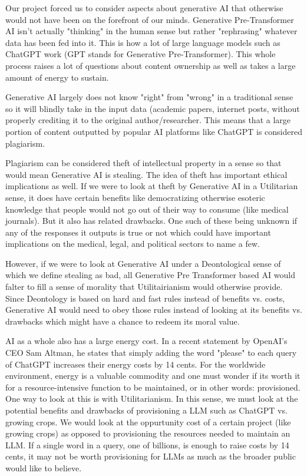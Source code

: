 \documentclass[letterpaper,11pt,leqno]{article}
\begin{document}
Our project forced us to consider aspects about generative AI that otherwise would not have been on the forefront of our minds. Generative Pre-Transformer AI isn't actually "thinking" in the human sense but rather "rephrasing" whatever data has been fed into it. This is how a lot of large language models such as ChatGPT work (GPT stands for Generative Pre-Transformer). This whole process raises a lot of questions about content ownership as well as takes a large amount of energy to sustain.

Generative AI largely does not know "right" from "wrong" in a traditional sense so it will blindly take in the input data (academic papers, internet posts, without properly crediting it to the original author/researcher. This means that a large portion of content outputted by popular AI platforms like ChatGPT is considered plagiarism. 

Plagiarism can be considered theft of intellectual property in a sense so that would mean Generative AI is stealing. The idea of theft has important ethical implications as well. If we were to look at theft by Generative AI in a Utilitarian sense, it does have certain benefits like democratizing otherwise esoteric knowledge that people would not go out of their way to consume (like medical journals). But it also has related drawbacks. One such of these being unknown if any of the responses it outputs is true or not which could have important implications on the medical, legal, and political sectors to name a few. 

However, if we were to look at Generative AI under a Deontological sense of which we define stealing as bad, all Generative Pre Transformer based AI would falter to fill a sense of morality that Utilitairianism would otherwise provide. Since Deontology is based on hard and fast rules instead of benefits vs. costs, Generative AI would need to obey those rules instead of looking at its benefits vs. drawbacks which might have a chance to redeem its moral value. 

AI as a whole also has a large energy cost. In a recent statement by OpenAI's CEO Sam Altman, he states that simply adding the word "please" to each query of ChatGPT increases their energy costs by 14 cents. For the worldwide environment, energy is a valuable commodity and one must wonder if its worth it for a resource-intensive function to be maintained, or in other words: provisioned. One way to look at this is with Utilitarianism. In this sense, we must look at the potential benefits and drawbacks of provisioning a LLM such as ChatGPT vs. growing crops. We would look at the oppurtunity cost of a certain project (like growing crops) as opposed to provisioning the resources needed to maintain an LLM. If a single word in a query, one of billions, is enough to raise costs by 14 cents, it may not be worth provisioning for LLMs as much as the broader public would like to believe. 
\end{document}
